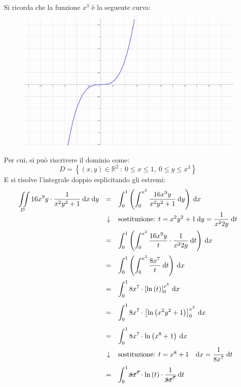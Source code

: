 \documentclass[a4paper]{article}
\begin{document}
	\noindent
	Si ricorda che la funzione $x^{3}$ è la seguente curva:
	\begin{figure}[!htp]
		\centering
		\includegraphics[width=.5\textwidth]{img/integrazione_per_fili_6.pdf}
	\end{figure}

	\noindent
	Per cui, si può riscrivere il dominio come:
	\begin{equation*}
		D = \left\{\left(x,y\right) \in \mathbb{R}^{2} \: : \: 0 \le x \le 1, \: 0 \le y \le x^{3}\right\}
	\end{equation*}
	E si risolve l'integrale doppio esplicitando gli estremi:
	\begin{equation*}
		\begin{array}{rcl}
			\displaystyle\iint\limits_{D} 16x^{9}y \cdot \dfrac{1}{x^{2}y^{2} + 1} \:\mathrm{d}x\:\mathrm{d}y
			&=&
			\displaystyle\int_{0}^{1} \left(\int_{0}^{x^{3}} \dfrac{16x^{9}y}{x^{2}y^{2} + 1} \:\mathrm{d}y\right) \:\mathrm{d}x \\ [1em]
			&\downarrow& \text{sostituzione: }t=x^{2}y^{2}+1 \: \mathrm{d}y = \dfrac{1}{x^{2}2y} \:\mathrm{d}t \\ [1em]
			&=&
			\displaystyle\int_{0}^{1} \left(\int_{0}^{x^{3}} \dfrac{16x^{9}y}{t} \cdot \dfrac{1}{x^{2}2y} \:\mathrm{d}t\right) \:\mathrm{d}x \\ [1.5em]
			&=&
			\displaystyle\int_{0}^{1} \left(\int_{0}^{x^{3}} \dfrac{8x^{7}}{t} \:\mathrm{d}t\right) \:\mathrm{d}x \\ [1.5em]
			&=&
			\displaystyle\int_{0}^{1} 8x^{7} \cdot \left[\ln\left(t\right)\right]_{0}^{x^{3}} \:\mathrm{d}x \\ [1.5em]
			&=&
			\displaystyle\int_{0}^{1} 8x^{7} \cdot \left[\ln\left(x^{2}y^{2}+1\right)\right]_{0}^{x^{3}} \:\mathrm{d}x \\ [1.5em]
			&=&
			\displaystyle\int_{0}^{1} 8x^{7} \cdot \ln\left(x^{8}+1\right) \:\mathrm{d}x \\ [1em]
			&\downarrow& \text{sostituzione: }t=x^{8}+1 \hspace{1em} \mathrm{d}x = \dfrac{1}{8x^{7}} \:\mathrm{d}t \\ [1em]
			&=&
			\displaystyle\int_{0}^{1} \cancel{8x^{7}} \cdot \ln\left(t\right) \cdot \dfrac{1}{\cancel{8x^{7}}} \:\mathrm{d}t
		\end{array}
	\end{equation*}\newpage
\end{document}
